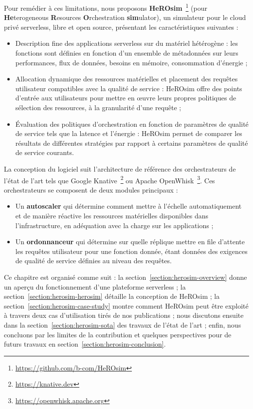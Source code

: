 Pour remédier à ces limitations, nous proposons \textbf{HeROsim}~\footnote{\href{https://github.com/b-com/HeROsim}{https://github.com/b-com/HeROsim}} (pour \textbf{He}terogeneous \textbf{R}esources \textbf{O}rchestration \textbf{sim}ulator), un simulateur pour le cloud privé serverless, libre et open source, présentant les caractéristiques suivantes :


\begin{itemize}
    \item Description fine des applications serverless sur du matériel hétérogène : les fonctions sont définies en fonction d'un ensemble de métadonnées sur leurs performances, flux de données, besoins en mémoire, consommation d'énergie ;
    \item Allocation dynamique des ressources matérielles et placement des requêtes utilisateur compatibles avec la qualité de service : HeROsim offre des points d'entrée aux utilisateurs pour mettre en œuvre leurs propres politiques de sélection des ressources, à la granularité d'une requête ;
    \item Évaluation des politiques d'orchestration en fonction de paramètres de qualité de service tels que la latence et l'énergie : HeROsim permet de comparer les résultats de différentes stratégies par rapport à certains paramètres de qualité de service courants.
\end{itemize}

La conception du logiciel suit l'architecture de référence des orchestrateurs de l'état de l'art tels que Google Knative~\footnote{\href{https://knative.dev}{https://knative.dev}} ou Apache OpenWhisk~\footnote{\href{https://openwhisk.apache.org}{https://openwhisk.apache.org}}. Ces orchestrateurs se composent de deux modules principaux :

\begin{itemize}
    \item Un \textbf{autoscaler} qui détermine comment mettre à l'échelle automatiquement et de manière réactive les ressources matérielles disponibles dans l'infrastructure, en adéquation avec la charge sur les applications ;
    \item Un \textbf{ordonnanceur} qui détermine sur quelle réplique mettre en file d'attente les requêtes utilisateur pour une fonction donnée, étant données des exigences de qualité de service définies au niveau des requêtes.
\end{itemize}

Ce chapitre est organisé comme suit : la section~\ref{section:herosim-overview} donne un aperçu du fonctionnement d'une plateforme serverless ; la section~\ref{section:herosim-herosim} détaille la conception de HeROsim ; la section~\ref{section:herosim-case-study} montre comment HeROsim peut être exploité à travers deux cas d'utilisation tirés de nos publications ; nous discutons ensuite dans la section~\ref{section:herosim-sota} des travaux de l'état de l'art ; enfin, nous concluons par les limites de la contribution et quelques perspectives pour de futurs travaux en section~\ref{section:herosim-conclusion}.

